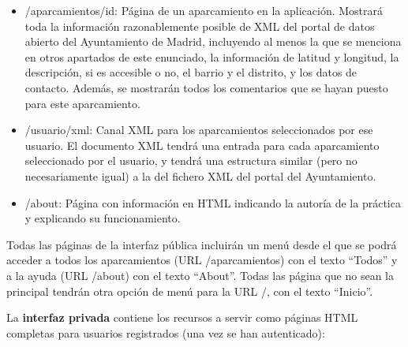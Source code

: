 \begin{itemize}
  \item /aparcamientos/{id}: Página de un aparcamiento en la aplicación. Mostrará toda la información razonablemente posible de XML del portal de datos abierto del Ayuntamiento de Madrid, incluyendo al menos la que se menciona en otros apartados de este enunciado, la información de latitud y longitud, la descripción, si es accesible o no, el barrio y el distrito, y los datos de contacto. Además, se mostrarán todos los comentarios que se hayan puesto para este aparcamiento.
  
  \item /{usuario}/xml: Canal XML para los aparcamientos seleccionados por ese usuario. El documento XML tendrá una entrada para cada aparcamiento seleccionado por el usuario, y tendrá una estructura similar (pero no necesariamente igual) a la del fichero XML del portal del Ayuntamiento.

  \item /about: Página con información en HTML indicando la autoría de la práctica y explicando su funcionamiento.

\end{itemize}

Todas las páginas de la interfaz pública incluirán un menú desde el que se podrá acceder a todos los aparcamientos (URL /aparcamientos) con el texto ``Todos'' y a la ayuda (URL /about) con el texto ``About''. Todas las página que no sean la principal tendrán otra opción de menú para la URL /, con el texto ``Inicio''.

La {\bf interfaz privada} contiene los recursos a servir como páginas HTML completas para usuarios registrados (una vez se han autenticado):

